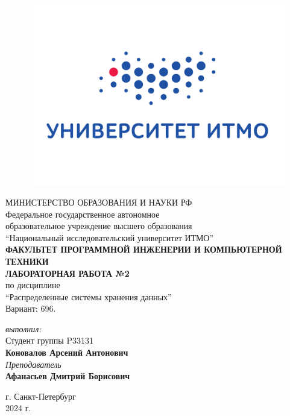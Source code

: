 \begin{center}

	\begin{figure}[H]
	\centering
	\includegraphics[scale=0.37]{img/logo.jpg}
	\end{figure}
	\hfill \break
	МИНИСТЕРСТВО ОБРАЗОВАНИЯ И НАУКИ РФ\\
	\hfill \break
	Федеральное государственное автономное\\
	образовательное учреждение высшего образования\\
	``Национальный исследовательский университет ИТМО''\\
	\hfill \break
	\textbf{ФАКУЛЬТЕТ ПРОГРАММНОЙ ИНЖЕНЕРИИ И КОМПЬЮТЕРНОЙ ТЕХНИКИ}\\
	\vspace{2cm}
	\large{\textbf{ЛАБОРАТОРНАЯ РАБОТА №2}}\\
	\hfill \break
	по дисциплине\\
	\large{``Распределенные системы хранения данных''}\\
	\hfill \break
	Вариант: 696.
	\vspace{3cm}
	\begin{flushright}
	\textit{выполнил:}\\
	Студент группы P33131\\
	\textbf{Коновалов Арсений Антонович}\\
	\textit{Преподаватель}\\
	\textbf{Афанасьев Дмитрий Борисович}
	\end{flushright}
\end{center}

\vfill

\begin{center} г. Санкт-Петербург\\2024 г.
\end{center}

\thispagestyle{empty}
\newpage